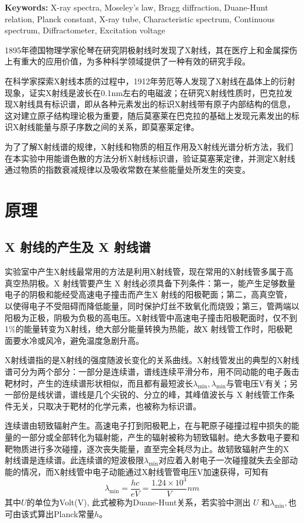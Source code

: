 \documentclass{whureport}
\begin{document}
\textbf{Keywords: }X-ray spectra, Moseley's law, Bragg diffraction, Duane-Hunt relation, Planck constant, X-ray tube, Characteristic spectrum, Continuous spectrum, Diffractometer, Excitation voltage

\begin{multicols}{2}
	1895年德国物理学家伦琴在研究阴极射线时发现了X射线，其在医疗上和金属探伤上有重大的应用价值，为多种科学领域提供了一种有效的研究手段。
		
	在科学家探索X射线本质的过程中，1912年劳厄等人发现了X射线在晶体上的衍射现象，证实X射线是波长在0.1nm左右的电磁波；在研究X射线性质时，巴克拉发现X射线具有标识谱，即从各种元素发出的标识X射线带有原子内部结构的信息，这对建立原子结构理论极为重要，随后莫塞莱在巴克拉的基础上发现元素发出的标识X射线能量与原子序数之间的关系，即莫塞莱定律。 
	
	为了了解X射线谱的规律，X射线和物质的相互作用及X射线光谱分析方法，我们在本实验中用能谱色散的方法分析X射线标识谱，验证莫塞莱定律，并测定X射线通过物质的指数衰减规律以及吸收常数在某些能量处所发生的突变。\cite{X射线的产生与X射线谱}
	\section{原理}
	\subsection{X 射线的产生及 X 射线谱}
	实验室中产生X射线最常用的方法是利用X射线管，现在常用的X射线管多属于高真空热阴极。X 射线管要产生 X 射线必须具备下列条件：第一，能产生足够数量电子的阴极和能经受高速电子撞击而产生X 射线的阳极靶面；第二，高真空管，以使得电子不受阻碍而降低能量，同时保护灯丝不致氧化而烧毁；第三，管两端以阳极为正极，阴极为负极的高电压。X射线管中高速电子撞击阳极靶面时，仅不到1\%的能量转变为X射线，绝大部分能量转换为热能，故X 射线管工作时，阳极靶面要水冷或风冷，避免温度急剧升高。
	
	X射线谱指的是X射线的强度随波长变化的关系曲线。X射线管发出的典型的X射线 谱可分为两个部分：一部分是连续谱，谱线连续平滑分布，用不同动能的电子轰击靶材时，产生的连续谱形状相似，而且都有最短波长$\lambda_{\min},\lambda_{\min}$与管电压V有关；另一部份是线状谱，谱线是几个尖锐的、分立的峰，其峰值波长与 X 射线管工作条件无关，只取决于靶材的化学元素，也被称为标识谱。
	
	连续谱由轫致辐射产生。高速电子打到阳极靶上，在与靶原子碰撞过程中损失的能量的一部分或全部转化为辐射能，产生的辐射被称为轫致辐射。绝大多数电子要和靶物质进行多次碰撞，逐次丧失能量，直至完全耗尽为止。故轫致辐射产生的X 射线谱是连续谱。此连续谱的短波极限$\lambda_{\min}$对应着入射电子一次碰撞就失去全部动能的情况，而X射线管中电子动能通过X射线管管电压V加速获得，可知有
	\begin{equation}\label{eq:DH}
		\lambda_{\min}=\dfrac{hc}{eV}=\dfrac{1.24\times10^3}{V}\unit{nm}
	\end{equation}
	其中$U$的单位为Volt(V), 此式被称为Duane-Hunt关系，若实验中测出 $U$ 和$\lambda_{\min},$也可由该式算出Planck常量$h$。
	

\end{multicols}
\end{document}
